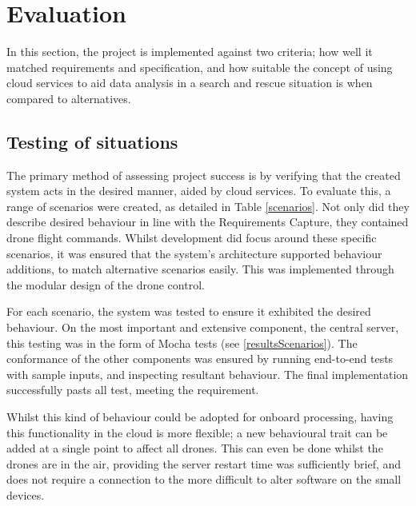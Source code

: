\documentclass{article}
\begin{document}
\section{Evaluation}
In this section, the project is implemented against two criteria; how well it matched requirements and specification, and how suitable the concept of using cloud services to aid data analysis in a search and rescue situation is when compared to alternatives.
 
\subsection{Testing of situations}
The primary method of assessing project success is by verifying that the created system acts in the desired manner, aided by cloud services. To evaluate this, a range of scenarios were created, as detailed in Table \ref{scenarios}. Not only did they describe desired behaviour in line with the Requirements Capture, they contained drone flight commands. Whilst development did focus around these specific scenarios, it was ensured that the system's architecture supported behaviour additions, to match alternative scenarios easily. This was implemented through the modular design of the drone control.

For each scenario, the system was tested to ensure it exhibited the desired behaviour. On the most important and extensive component, the central server, this testing was in the form of Mocha tests (see \ref{resultsScenarios}). The conformance of the other components was ensured by running end-to-end tests with sample inputs, and inspecting resultant behaviour. The final implementation successfully pasts all test, meeting the requirement. 

Whilst this kind of behaviour could be adopted for onboard processing, having this functionality in the cloud is more flexible; a new behavioural trait can be added at a single point to affect all drones. This can even be done whilst the drones are in the air, providing the server restart time was sufficiently brief, and does not require a connection to the more difficult to alter software on the small devices.
\end{document}
